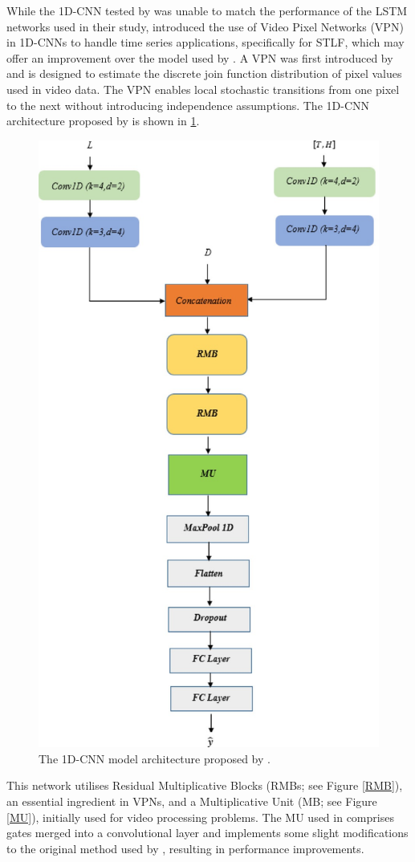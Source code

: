 \documentclass[mstat,12pt]{unswthesis}
\begin{document}
While the 1D-CNN tested by \cite{Chandra2021} was unable to match the performance of the LSTM networks used in their study, \cite{Yazici2022} introduced the use of Video Pixel Networks (VPN) in 1D-CNNs to handle time series applications, specifically for STLF, which may offer an improvement over the model used by \cite{Chandra2021}. A VPN was first introduced by \cite{Kalchbrenner2017} and is designed to estimate the discrete join function distribution of pixel values used in video data. The VPN enables local stochastic transitions from one pixel to the next without introducing independence assumptions. The 1D-CNN architecture proposed by \cite{Yazici2022} is shown in \ref{1DCNN}. 

\begin{figure}[H]
\centerline{\includegraphics[width=0.5\columnwidth]{Final Report/Figures/Yazici2022_1DCNN.jpg}}
\caption{The 1D-CNN model architecture proposed by \cite{Yazici2022}.}
\label{1DCNN}
\end{figure}

This network utilises Residual Multiplicative Blocks (RMBs; see Figure \ref{RMB}), an essential ingredient in VPNs, and a Multiplicative Unit (MB; see Figure \ref{MU}), initially used for video processing problems. The MU used in \cite{Yazici2022} comprises gates merged into a convolutional layer and implements some slight modifications to the original method used by \cite{Kalchbrenner2017}, resulting in performance improvements.
\end{document}
